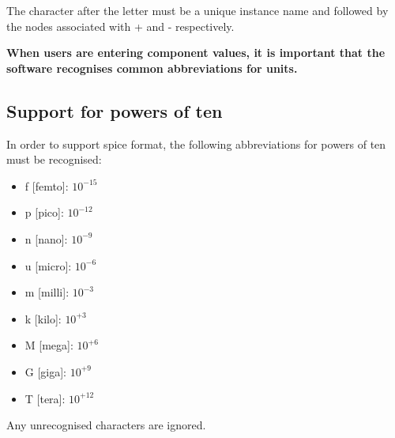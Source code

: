 \documentclass[a4paper, titlepage]{article}
\begin{document}
    \par
    The character after the letter must be a unique instance name and followed by the nodes associated with + and - respectively.
    \par
    \textbf {When users are entering component values, it is important that the software recognises common abbreviations for units.}

    \subsection{Support for powers of ten}
    In order to support {\selectfont spice} format, the following abbreviations for powers of ten must be recognised:
    \begin{itemize}
        \item f [femto]: $ 10^{-15} $
        \item p [pico]: $ 10^{-12} $
        \item n [nano]: $ 10^{-9} $
        \item u [micro]: $ 10^{-6} $
        \item m [milli]: $ 10^{-3} $
        \item k [kilo]: $ 10^{+3} $
        \item M [mega]: $ 10^{+6} $
        \item G [giga]: $ 10^{+9} $
        \item T [tera]: $ 10^{+12} $
    \end{itemize}
    Any unrecognised characters are ignored.
\end{document}
